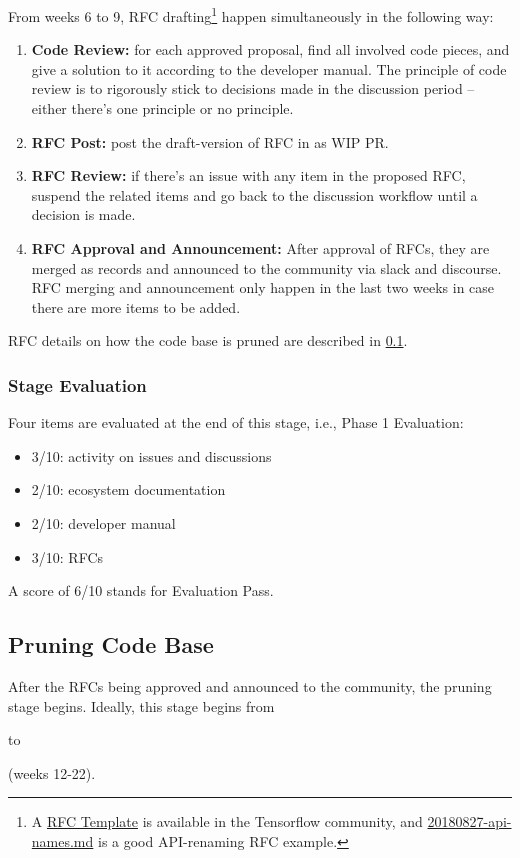 From weeks 6 to 9, RFC drafting\footnote{A \href{https://github.com/tensorflow/community/blob/master/rfcs/yyyymmdd-rfc-template.md}{RFC Template} is available in the Tensorflow community, and \href{https://github.com/tensorflow/community/blob/master/rfcs/20180827-api-names.md}{20180827-api-names.md} is a good API-renaming RFC example.} happen simultaneously in the following way:
\begin{enumerate}
    \item \textbf{Code Review:} for each approved proposal, find all involved code pieces, and give a solution to it according to the developer manual. The principle of code review is to rigorously stick to decisions made in the discussion period -- either there's one principle or no principle.
    \item \textbf{RFC Post:} post the draft-version of RFC in \repoimagesgithubio{} as WIP PR.
    \item \textbf{RFC Review:} if there's an issue with any item in the proposed RFC, suspend the related items and go back to the discussion workflow until a decision is made.
    \item \textbf{RFC Approval and Announcement:} After approval of RFCs, they are merged as records and announced to the community via slack and discourse. RFC merging and announcement only happen in the last two weeks in case there are more items to be added.
\end{enumerate}
RFC details on how the code base is pruned are described in \cref{subsec:prune}.

\subsubsection*{Stage Evaluation}

Four items are evaluated at the end of this stage, i.e., \textsf{Phase 1 Evaluation}:
\begin{itemize}
    \item 3/10: activity on issues and discussions
    \item 2/10: ecosystem documentation
    \item 2/10: developer manual
    \item 3/10: RFCs
\end{itemize}
A score of 6/10 stands for \textsf{Evaluation Pass}.

\newpage
\subsection{Pruning Code Base}\label{subsec:prune}
After the RFCs being approved and announced to the community, the pruning stage begins. Ideally, this stage begins from \date{July 1} to \date{August 26} (weeks 12-22).

